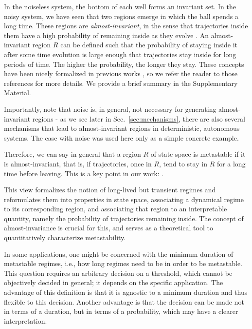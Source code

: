 In the noiseless system, the bottom of each well forms an invariant set. In the noisy system, we have seen that two regions emerge in which the ball spends a long time. These regions are \textit{almost-invariant}, in the sense that trajectories inside them have a high probability of remaining inside as they evolve \cite{froyland2005statistically, dellnitz2003congestion}. An almost-invariant region $R$ can be defined such that the probability of staying inside it after some time evolution is large enough that trajectories stay inside for long periods of time. The higher the probability, the longer they stay.  These concepts have been nicely formalized in previous works \cite{froyland2005statistically, dellnitz2003congestion}, so we refer the reader to those references for more details. We provide a brief summary in the Supplementary Material.

Importantly, note that noise is, in general, not necessary for generating almost-invariant regions - as we see later in Sec.~\ref{sec:mechanisms}, there are also several mechanisms that lead to almost-invariant regions in deterministic, autonomous systems. The case with noise was used here only as a simple concrete example.

Therefore, we can say in general that a region $R$ of state space is metastable if it is almost-invariant, that is, if trajectories, once in $R$, tend to stay in $R$ for a long time before leaving. This is a key point in our work: .  

This view formalizes the notion of long-lived but transient regimes and reformulates them into properties in state space, associating a dynamical regime to its corresponding region, and associating that region to an interpretable quantity, namely the probability of trajectories remaining inside. The concept of almost-invariance is crucial for this, and serves as a theoretical tool to quantitatively characterize metastability.

In some applications, one might be concerned with the minimum duration of metastable regimes, i.e., how long regimes need to be in order to be metastable. This question requires an arbitrary decision on a threshold, which cannot be objectively decided in general; it depends on the specific application. The advantage of this definition is that it is agnostic to a minimum duration and thus flexible to this decision. Another advantage is that the decision can be made not in terms of a duration, but in terms of a probability, which may have a clearer interpretation. 

